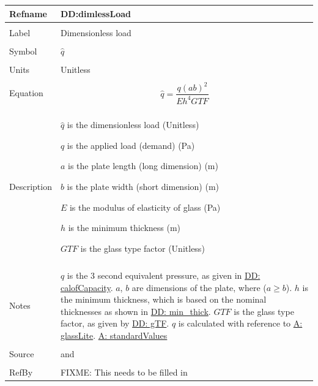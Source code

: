 \documentclass[12pt]{article}
\begin{document}
\noindent \begin{minipage}{\textwidth}
\begin{tabular}{p{} p{}}
\toprule \textbf{Refname} & \textbf{DD:dimlessLoad}
\label{DD:dimlessLoad}
\\ \midrule \\
Label & Dimensionless load
\\ \midrule \\
Symbol & $\hat{q}$
\\ \midrule \\
Units & Unitless
\\ \midrule \\
Equation & \begin{dmath}
           \hat{q}=\frac{q \left(a b\right)^{2}}{E h^{4} GTF}
           \end{dmath}
\\ \midrule \\
Description & \begin{symbDescription}
              \item{$\hat{q}$ is the dimensionless load (Unitless)}
              \item{$q$ is the applied load (demand) (Pa)}
              \item{$a$ is the plate length (long dimension) (m)}
              \item{$b$ is the plate width (short dimension) (m)}
              \item{$E$ is the modulus of elasticity of glass (Pa)}
              \item{$h$ is the minimum thickness (m)}
              \item{$GTF$ is the glass type factor (Unitless)}
              \end{symbDescription}
\\ \midrule \\
Notes & $q$ is the 3 second equivalent pressure, as given in \hyperref[DD:calofCapacity]{DD: calofCapacity}.
        $a$, $b$ are dimensions of the plate, where ($a\geq{}b$).
        $h$ is the minimum thickness, which is based on the nominal thicknesses as shown in \hyperref[DD:min.thick]{DD: min\_thick}.
        $GTF$ is the glass type factor, as given by \hyperref[DD:gTF]{DD: gTF}.
        $\hat{q}$ is calculated with reference to \hyperref[A:glassLite]{A: glassLite}.
        \hyperref[A:standardValues]{A: standardValues}
\\ \midrule \\
Source & \cite{astm2009} and \cite{campidelli}
\\ \midrule \\
RefBy & FIXME: This needs to be filled in
\\ \bottomrule \end{tabular}
\end{minipage}\\
\end{document}
